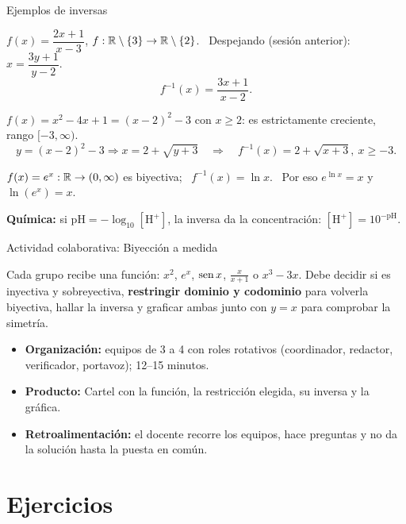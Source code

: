 \documentclass[10pt,aspectratio=169]{beamer}
\begin{document}
\begin{frame}{Ejemplos de inversas}
  \begin{ejemplo}[11]
    $f(x)=\dfrac{2x+1}{x-3}$, $f:\mathbb{R}\setminus\{3\}\to\mathbb{R}\setminus\{2\}$. \ Despejando (sesión anterior): $x=\dfrac{3y+1}{y-2}$.
    \[ f^{-1}(x)=\frac{3x+1}{x-2}. \]
  \end{ejemplo}
  \begin{ejemplo}
    $f(x)=x^2-4x+1=(x-2)^2-3$ con $x\ge2$: es estrictamente creciente, rango $[-3,\infty)$.
    \[ y=(x-2)^2-3\Rightarrow x=2+\sqrt{y+3}\quad\Rightarrow\quad f^{-1}(x)=2+\sqrt{x+3},\ x\ge-3. \]
  \end{ejemplo}
  \begin{ejemplo}
    $f(x)=e^x:\mathbb{R}\to(0,\infty)$ es biyectiva; \ $f^{-1}(x)=\ln x$. \ Por eso $e^{\ln x}=x$ y $\ln(e^x)=x$.
  \end{ejemplo}
  \small \textbf{Química:} si $\mathrm{pH}=-\log_{10}[\mathrm{H^+}]$, la inversa da la concentración: $[\mathrm{H^+}]=10^{-\mathrm{pH}}$.
\end{frame}

\begin{frame}{Actividad colaborativa: Biyección a medida}
  \small
  \begin{activa}
    Cada grupo recibe una función: $x^2$, $e^x$, $\operatorname{sen} x$, $\frac{x}{x+1}$ o $x^3-3x$. Debe decidir si es inyectiva y sobreyectiva, \textbf{restringir dominio y codominio} para volverla biyectiva, hallar la inversa y graficar ambas junto con $y=x$ para comprobar la simetría.
  \end{activa}
  \begin{itemize}
    \item \textbf{Organización:} equipos de 3 a 4 con roles rotativos (coordinador, redactor, verificador, portavoz); 12--15 minutos.
    \item \textbf{Producto:} Cartel con la función, la restricción elegida, su inversa y la gráfica.
    \item \textbf{Retroalimentación:} el docente recorre los equipos, hace preguntas y no da la solución hasta la puesta en común.
  \end{itemize}
\end{frame}

\section{Ejercicios}
\end{document}
